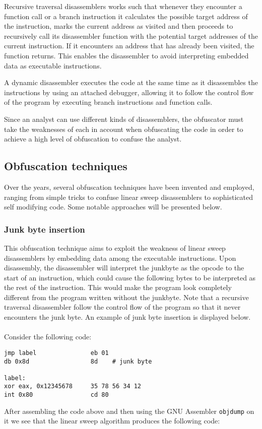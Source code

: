 \documentclass[11pt,twoside]{eitExjobb}
\begin{document}
Recursive traversal disassemblers works such that whenever they encounter a function call or a branch instruction it calculates the possible target address of the instruction, marks the current address as visited and then proceeds to recursively call its disassembler function with the potential target addresses of the current instruction. If it encounters an address that has already been visited, the function returns. This enables the disassembler to avoid interpreting embedded data as executable instructions.

A dynamic disassembler executes the code at the same time as it disassembles the instructions by using an attached debugger, allowing it to follow the control flow of the program by executing branch instructions and function calls. 

Since an analyst can use different kinds of disassemblers, the obfuscator must take the weaknesses of each in account when obfuscating the code in order to achieve a high level of obfuscation to confuse the analyst.

\subsection{Obfuscation techniques}
Over the years, several obfuscation techniques have been invented and employed, ranging from simple tricks to confuse linear sweep disassemblers to sophisticated self modifying code. Some notable approaches will be presented below.

\subsubsection{Junk byte insertion}
This obfuscation technique aims to exploit the weakness of linear sweep disassemblers by embedding data among the executable instructions. Upon disassembly, the disassembler will interpret the junkbyte as the opcode to the start of an instruction, which could cause the following bytes to be interpreted as the rest of the instruction. This would make the program look completely different from the program written without the junkbyte. Note that a recursive traversal disassembler follow the control flow of the program so that it never encounters the junk byte. An example of junk byte insertion is displayed below.\cite{instructionoverlapping}
\\
\\
Consider the following code:
\begin{verbatim}
jmp label               eb 01
db 0x8d                 8d    # junk byte

label:
xor eax, 0x12345678     35 78 56 34 12
int 0x80                cd 80
\end{verbatim}
\noindent After assembling the code above and then using the GNU Assembler \texttt{objdump}\cite{objdump} on it we see that the linear sweep algorithm produces the following code:
\end{document}
